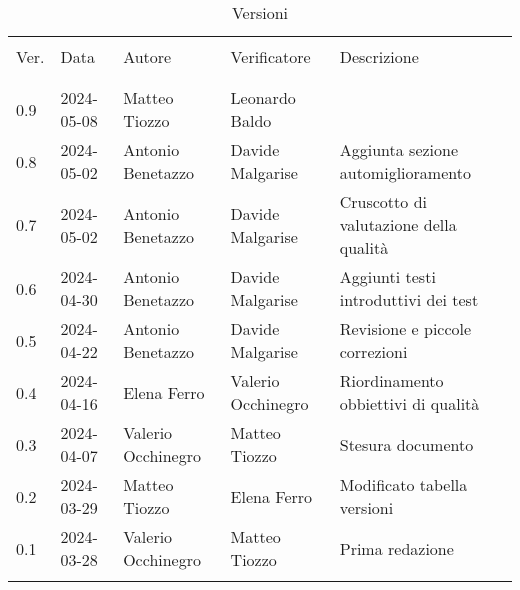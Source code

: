 \documentclass[italian,12pt]{article} %
\begin{document}

\newpage

\captionsetup[table]{list=no}
\begin{table}[!h]
	\caption*{Versioni}
	\footnotesize
	\begin{center}
		\begin{tabular}{ l l l l p{6cm} }
			\hline                                                                                               \\[-2ex]
			Ver. & Data       & Autore             & Verificatore       & Descrizione                            \\
			\\[-2ex] \hline \\[-1.5ex]
			0.9  & 2024-05-08 & Matteo Tiozzo      & Leonardo Baldo     &  \\
			0.8  & 2024-05-02 & Antonio Benetazzo  & Davide Malgarise   & Aggiunta sezione automiglioramento     \\
			0.7  & 2024-05-02 & Antonio Benetazzo  & Davide Malgarise   & Cruscotto di valutazione della qualità \\
			0.6  & 2024-04-30 & Antonio Benetazzo  & Davide Malgarise   & Aggiunti testi introduttivi dei test   \\
			0.5  & 2024-04-22 & Antonio Benetazzo  & Davide Malgarise   & Revisione e piccole correzioni         \\
			0.4  & 2024-04-16 & Elena Ferro        & Valerio Occhinegro & Riordinamento obbiettivi di qualità    \\
			0.3  & 2024-04-07 & Valerio Occhinegro & Matteo Tiozzo      & Stesura documento                      \\
			0.2  & 2024-03-29 & Matteo Tiozzo      & Elena Ferro        & Modificato tabella versioni            \\
			0.1  & 2024-03-28 & Valerio Occhinegro & Matteo Tiozzo      & Prima redazione                        \\
			\\[-1.5ex] \hline
		\end{tabular}
	\end{center}
\end{table}
\captionsetup[table]{list=yes}
\newpage
\tableofcontents
\listoftables
\listoffigures
\newpage





\end{document}
